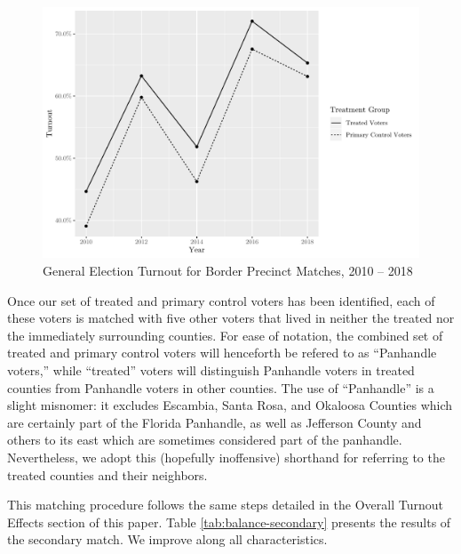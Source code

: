 \documentclass[
  12pt,
]{article}
\begin{document}
\begin{figure}[H]

{\centering \includegraphics{hurricane_michael_files/figure-latex/ll-to-chunk-1} 

}

\caption{\label{fig:ll-to}General Election Turnout for Border Precinct Matches, 2010 -- 2018}\label{fig:ll-to-chunk}
\end{figure}

Once our set of treated and primary control voters has been identified, each of these voters is matched with five other voters that lived in neither the treated nor the immediately surrounding counties. For ease of notation, the combined set of treated and primary control voters will henceforth be refered to as ``Panhandle voters,'' while ``treated'' voters will distinguish Panhandle voters in treated counties from Panhandle voters in other counties. The use of ``Panhandle'' is a slight misnomer: it excludes Escambia, Santa Rosa, and Okaloosa Counties which are certainly part of the Florida Panhandle, as well as Jefferson County and others to its east which are sometimes considered part of the panhandle. Nevertheless, we adopt this (hopefully inoffensive) shorthand for referring to the treated counties and their neighbors.

This matching procedure follows the same steps detailed in the Overall Turnout Effects section of this paper. Table \ref{tab:balance-secondary} presents the results of the secondary match. We improve along all characteristics.
\end{document}
